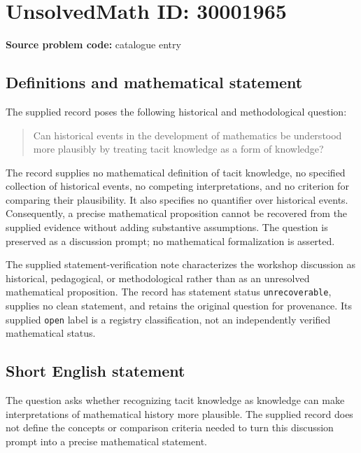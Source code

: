 \documentclass[11pt]{article}
\begin{document}
\section*{UnsolvedMath ID: 30001965}
\textbf{Source problem code:} catalogue entry
\subsection{Definitions and mathematical statement}
The supplied record poses the following historical and methodological question:
\begin{quote}
Can historical events in the development of mathematics be understood more plausibly by treating tacit knowledge as a form of knowledge?
\end{quote}
The record supplies no mathematical definition of tacit knowledge, no specified collection of historical events, no competing interpretations, and no criterion for comparing their plausibility. It also specifies no quantifier over historical events. Consequently, a precise mathematical proposition cannot be recovered from the supplied evidence without adding substantive assumptions. The question is preserved as a discussion prompt; no mathematical formalization is asserted.

The supplied statement-verification note characterizes the workshop discussion as historical, pedagogical, or methodological rather than as an unresolved mathematical proposition. The record has statement status \texttt{unrecoverable}, supplies no clean statement, and retains the original question for provenance. Its supplied \texttt{open} label is a registry classification, not an independently verified mathematical status.
\subsection{Short English statement}
The question asks whether recognizing tacit knowledge as knowledge can make interpretations of mathematical history more plausible. The supplied record does not define the concepts or comparison criteria needed to turn this discussion prompt into a precise mathematical statement.
\end{document}
